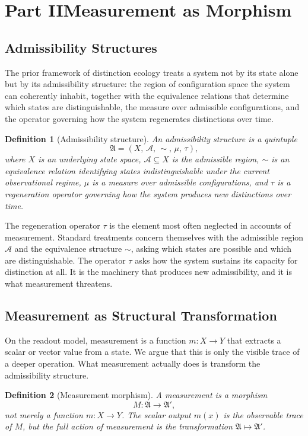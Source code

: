 \documentclass[12pt, a4paper]{article}
\theoremstyle{flyxion}
\newtheorem{definition}{Definition}
\newcommand{\fA}{\mathfrak{A}}
\newcommand{\cA}{\mathcal{A}}
\begin{document}
\section*{Part II\quad Measurement as Morphism}

\subsection*{Admissibility Structures}

The prior framework of distinction ecology treats a system not by its state alone but by its admissibility structure: the region of configuration space the system can coherently inhabit, together with the equivalence relations that determine which states are distinguishable, the measure over admissible configurations, and the operator governing how the system regenerates distinctions over time.

\begin{definition}[Admissibility structure]
An admissibility structure is a quintuple
\[
  \fA = (X,\,\cA,\,{\sim},\,\mu,\,\tau),
\]
where $X$ is an underlying state space, $\cA \subseteq X$ is the admissible region, ${\sim}$ is an equivalence relation identifying states indistinguishable under the current observational regime, $\mu$ is a measure over admissible configurations, and $\tau$ is a regeneration operator governing how the system produces new distinctions over time.
\end{definition}

The regeneration operator $\tau$ is the element most often neglected in accounts of measurement. Standard treatments concern themselves with the admissible region $\cA$ and the equivalence structure ${\sim}$, asking which states are possible and which are distinguishable. The operator $\tau$ asks how the system sustains its capacity for distinction at all. It is the machinery that produces new admissibility, and it is what measurement threatens.

\subsection*{Measurement as Structural Transformation}

On the readout model, measurement is a function $m: X \to Y$ that extracts a scalar or vector value from a state. We argue that this is only the visible trace of a deeper operation. What measurement actually does is transform the admissibility structure.

\begin{definition}[Measurement morphism]
A measurement is a morphism
\[
  M : \fA \longrightarrow \fA',
\]
not merely a function $m: X \to Y$. The scalar output $m(x)$ is the observable trace of $M$, but the full action of measurement is the transformation $\fA \mapsto \fA'$.
\end{definition}
\end{document}
